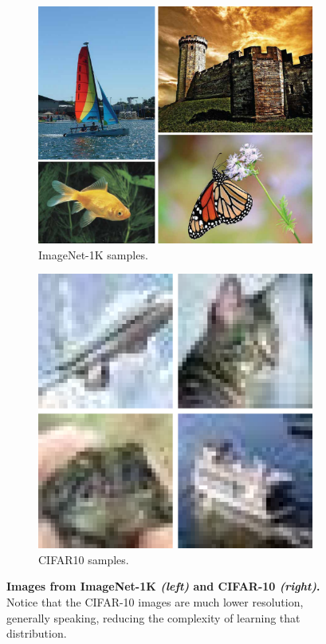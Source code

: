 \documentclass[../../book-main.tex]{subfiles}
\begin{document}
\begin{figure}
    \centering
    
    \hfill 
    \begin{subfigure}{0.3\textwidth}
        \centering 
        \includegraphics[width=\textwidth]{figs_chap7/imagenet.pdf}
        \caption{\small ImageNet-1K samples.}
    \end{subfigure}
    \hfill 
    \begin{subfigure}{0.26\textwidth}
        \centering 
        \includegraphics[width=\textwidth]{figs_chap7/cifar10.pdf}
        \caption{\small CIFAR10 samples.}
    \end{subfigure}
    \hfill 
    \phantom{}

    \caption{\small\textbf{Images from ImageNet-1K \textit{(left)} and CIFAR-10 \textit{(right)}.} Notice that the CIFAR-10 images are much lower resolution, generally speaking, reducing the complexity of learning that distribution.}
    \label{fig:in1k_cifar10_examples}
\end{figure}
\end{document}
